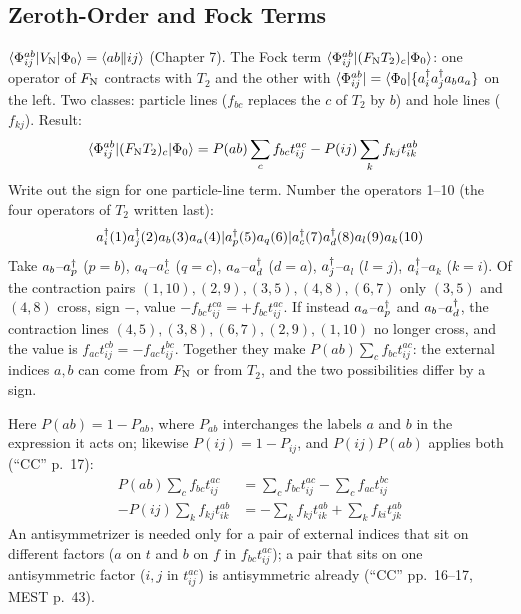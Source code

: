 \subsection{Zeroth-Order and Fock Terms}

$\langle \Phi_{ij}^{ab}|V_{\mathrm{N}} |\Phi_0\rangle = \langle ab\Vert ij\rangle$ (Chapter 7). The Fock term $\langle \Phi_{ij}^{ab}|(F_{\mathrm{N}}  T_2)_c|\Phi_0\rangle$: one operator of $F_{\mathrm{N}}$ contracts with $T_2$ and the other with $\langle \Phi_{ij}^{ab}| = \langle \Phi_0|\{a^{\dagger}_{i} a^{\dagger}_{j} a_{b} a_{a}\}$ on the left. Two classes: particle lines ($f_{bc}$ replaces the $c$ of $T_2$ by $b$) and hole lines ($f_{kj}$). Result:
\begin{align*}
\langle \Phi_{ij}^{ab}|(F_{\mathrm{N}}  T_2)_c|\Phi_0\rangle &= P(ab) \sum_c f_{bc} t_{ij}^{ac} - P(ij) \sum_k f_{kj} t_{ik}^{ab}
\end{align*}
Write out the sign for one particle-line term. Number the operators 1--10 (the four operators of $T_2$ written last):
\begin{align*}
a^{\dagger}_{i} (1)  a^{\dagger}_{j} (2)  a_{b} (3)  a_{a} (4)  |  a^{\dagger}_{p} (5)  a_{q} (6)  |  a^{\dagger}_{c} (7)  a^{\dagger}_{d} (8)  a_{l} (9)  a_{k} (10)
\end{align*}
Take $a_{b}$--$a^{\dagger}_{p}$ ($p = b$), $a_{q}$--$a^{\dagger}_{c}$ ($q = c$), $a_{a}$--$a^{\dagger}_{d}$ ($d = a$), $a^{\dagger}_{j}$--$a_l$ ($l = j$), $a^{\dagger}_{i}$--$a_k$ ($k = i$). Of the contraction pairs $(1,10), (2,9), (3,5), (4,8), (6,7)$ only $(3,5)$ and $(4,8)$ cross, sign $-$, value $-f_{bc} t_{ij}^{ca} = +f_{bc} t_{ij}^{ac}$. If instead $a_{a}$--$a^{\dagger}_{p}$ and $a_{b}$--$a^{\dagger}_{d}$, the contraction lines $(4,5), (3,8), (6,7), (2,9), (1,10)$ no longer cross, and the value is $f_{ac} t_{ij}^{cb} = -f_{ac} t_{ij}^{bc}$. Together they make $P(ab) \sum_c f_{bc} t_{ij}^{ac}$: the external indices $a, b$ can come from $F_{\mathrm{N}}$ or from $T_2$, and the two possibilities differ by a sign.

Here $P(ab) = 1 - P_{ab}$, where $P_{ab}$ interchanges the labels $a$ and $b$ in the expression it acts on; likewise $P(ij) = 1 - P_{ij}$, and $P(ij) P(ab)$ applies both (“CC” p.~17):
\begin{align*}
P(ab) \sum_c f_{bc} t_{ij}^{ac} &= \sum_c f_{bc} t_{ij}^{ac} - \sum_c f_{ac} t_{ij}^{bc} \\
-P(ij) \sum_k f_{kj} t_{ik}^{ab} &= -\sum_k f_{kj} t_{ik}^{ab} + \sum_k f_{ki} t_{jk}^{ab}
\end{align*}
An antisymmetrizer is needed only for a pair of external indices that sit on different factors ($a$ on $t$ and $b$ on $f$ in $f_{bc} t_{ij}^{ac}$); a pair that sits on one antisymmetric factor ($i, j$ in $t_{ij}^{ac}$) is antisymmetric already (“CC” pp.~16--17, MEST p.~43).

